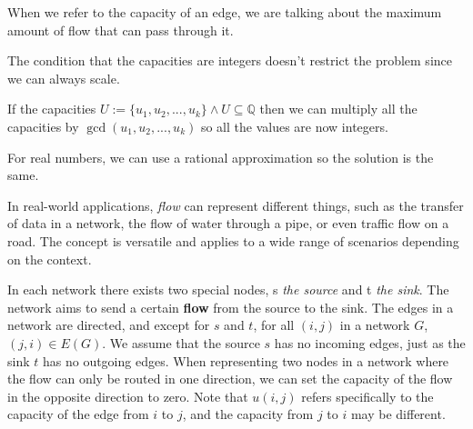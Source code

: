 When we refer to the capacity of an edge, we are talking about the maximum amount of flow that can pass through it.

\begin{obs}
    The condition that the capacities are integers doesn't restrict the problem since we can always scale.

    If the capacities $U:= \{u_1, u_2, ..., u_k\} \land U \subseteq \mathbb{Q}$ then we can multiply all the capacities by $ \gcd (u_1, u_2, ..., u_k)$ so all the values are now integers.

    For real numbers, we can use a rational approximation so the solution is the same.
\end{obs}

In real-world applications, \textit{flow} can represent different things, such as the transfer of data in a network, the flow of water through a pipe, or even traffic flow on a road. The concept is versatile and applies to a wide range of scenarios depending on the context.

In each network there exists two special nodes, s \textit{the source} and t \textit{the sink}. The network aims to send a certain \textbf{flow} from the source to the sink.
The edges in a network are directed, and except for $s$ and $t$, for all $(i,j)$ in a network $G$, $(j,i) \in E(G)$. We assume that the source $s$ has no incoming edges, just as the sink $t$ has no outgoing edges.
When representing two nodes in a network where the flow can only be routed in one direction, we can set the capacity of the flow in the opposite direction to zero.
Note that $u(i,j)$ refers specifically to the capacity of the edge from $i$ to $j$, and the capacity from $j$ to $i$ may be different.

